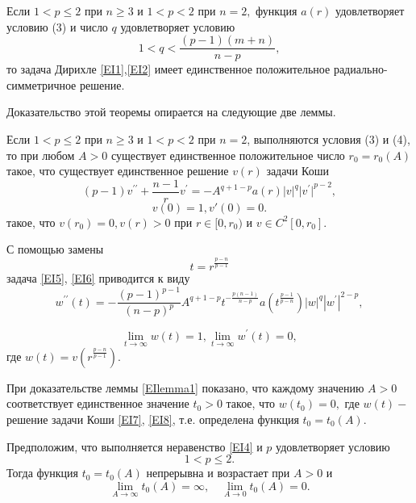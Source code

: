 \begin{theorem}\label{EItheo1}
Если $ 1<p \leq 2 $ при $n\geq 3$ и $ 1<p<2 $
при $n=2,$ функция $a(r)$ удовлетворяет условию (3) и число $q$
удовлетворяет условию
\begin{equation}\label{EI4}
1< q<\frac{(p-1)(m+n)}{n-p},
\end{equation}
то задача Дирихле \eqref{EI1},\eqref{EI2} имеет единственное положительное
радиально-симметричное решение.
\end{theorem}
Доказательство этой теоремы опирается на следующие две леммы.

\begin{lemma}\label{EIlemma1}
Если $ 1<p\leq 2 $ при $ n\geq 3 $ и $ 1<p<2  $
при $ n=2 $, выполняются условия (3) и (4),  то при любом $ A>0$
существует единственное положительное число $ r_0=r_0(A) $ такое,
что существует единственное решение $ v( r) $ задачи Коши
\begin{equation}\label{EI5}
(p-1)v^{\prime\prime}+\frac{n-1}{r}v^{\prime}= -A^{q+1-p}{a(r)\vert
v \vert}^q{\vert  v^{\prime} \vert}^{p-2},  
\end{equation}
\begin{equation}\label{EI6}
v(0)=1, v'(0)=0.
\end{equation}
 такое,
что $ v( r_0)=0, v( r)>0 $ при $
 r \in [0, r_0) $ и $ v \in C^2[0, r_0].$
\end{lemma}
С помощью замены
$$
 t=r^{\frac{p-n}{p-1}}
$$
задача \eqref{EI5}, \eqref{EI6} приводится к виду
\begin{equation}\label{EI7}
w^{\prime\prime}(t)=-\frac{(p-1)^{p-1}}{(n-p)^p}A^{q+1-p}
t^{-\frac{p(n-1)}{n-p}} a(t^{\frac{p-1}{p-n}})|w|^q
|w^{\prime}|^{2-p},
\end{equation}

\begin{equation}\label{EI8}
\lim_{t \to \infty}w(t)=1,
 \lim_{t \to \infty}w^{\prime}(t)=0,
\end{equation}
где $ w(t)=v(r^{\frac{p-n}{p-1}}).$

При доказательстве леммы \ref{EIlemma1} показано, что каждому значению $A>0$
соответствует  единственное значение $t_0>0 $ такое, что $w(t_0)=0,$
где $w(t)-$
решение задачи Коши \eqref{EI7}, \eqref{EI8}, т.е. определена функция $t_0=t_0(A).$

\begin{lemma}\label{EIlemma2}
 Предположим, что выполняется  неравенство \eqref{EI4} и $p$ удовлетворяет условию
  $$
     1 < p \leq 2.
  $$
  Тогда функция $t_0=t_0(A)$ непрерывна и возрастает при $A >0$ и
  $$
 \lim_{A\rightarrow \infty}t_0(A)=\infty, \quad \lim_{A \rightarrow
 0}t_0(A)=0.
  $$
\end{lemma}

